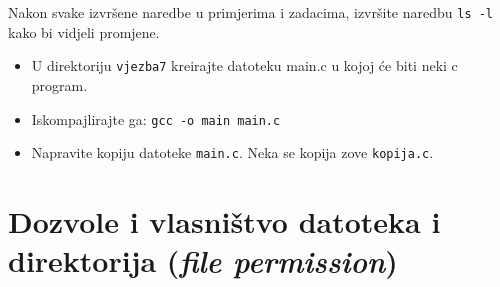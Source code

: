 \begin{zadatak} Nakon svake izvršene naredbe u primjerima i zadacima, izvršite naredbu \texttt{ls -l} kako bi vidjeli promjene.
\begin{itemize}
\item U direktoriju \texttt{vjezba7} kreirajte datoteku main.c u kojoj će biti neki c program.
\item Iskompajlirajte ga: \texttt{gcc -o main main.c} 
\item Napravite kopiju datoteke \texttt{main.c}. Neka se kopija zove \texttt{kopija.c}.
\end{itemize}
\end{zadatak}

\section*{Dozvole i vlasništvo datoteka i direktorija (\textit{file permission})}
